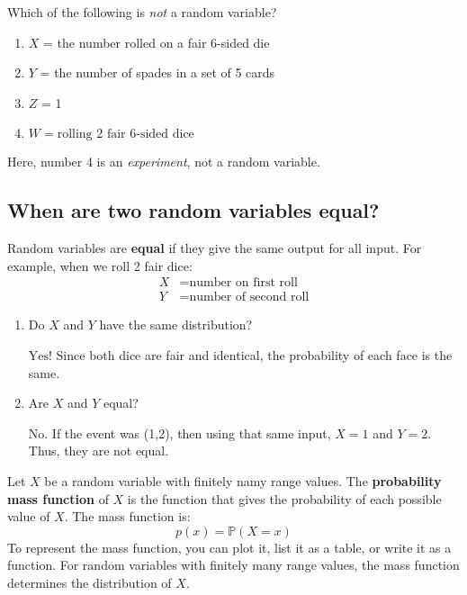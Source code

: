 \documentclass[titlepage, 12pt, leqno]{article}
\begin{document}
\begin{ex}
    Which of the following is \textit{not} a random variable?
    \begin{enumerate}
        \item $X$ = the number rolled on a fair 6-sided die
        \item $Y$ = the number of spades in a set of 5 cards
        \item $Z$ = 1
        \item $\boxed{W = \text{rolling 2 fair 6-sided dice}}$
    \end{enumerate} 
    Here, number 4 is an \textit{experiment}, not a random variable.
\end{ex}

\subsection{When are two random variables equal?}
Random variables are \textbf{equal} if they give the same output for all input.
For example, when we roll 2 fair dice:
\begin{align*}
    X &= \text{number on first roll} \\
    Y &= \text{number of second roll}
\end{align*}

\begin{enumerate}
    \item Do $X$ and $Y$ have the same distribution?

        $\boxed{ \text{Yes!}}$ Since both dice are fair and identical, the 
        probability of each face is the same.

    \item Are $X$ and $Y$ equal?

        $\boxed{ \text{No.}}$ If the event was (1,2), then using that same input,
        $X=1$ and $Y=2$. Thus, they are not equal.
\end{enumerate}

\begin{definition}
    Let $X$ be a random variable with finitely namy range values. The 
    \textbf{probability mass function} of $X$ is the function that gives the 
    probability of each possible value of $X$. The mass function is:
    \[
    p(x) = \mathbb{P}(X=x)
    \]
   To represent the mass function, you can plot it, list it as a table, or write
   it as a function. For random variables with finitely many range values, the
   mass function determines the distribution of $X$. 
\end{definition}
\end{document}
